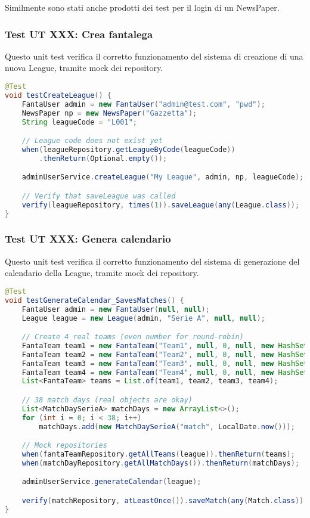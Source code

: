Similmente sono stati anche prodotti dei test per il login di un NewsPaper.


\subsubsection{Test UT XXX: Crea fantalega} \label{UT3}

Questo unit test verifica il corretto funzionamento del sistema di creazione di una nuova League,
tramite mock dei repository.

\begin{lstlisting}[language=Java]
@Test
void testCreateLeague() {
	FantaUser admin = new FantaUser("admin@test.com", "pwd");
	NewsPaper np = new NewsPaper("Gazzetta");
	String leagueCode = "L001";

	// League code does not exist yet
	when(leagueRepository.getLeagueByCode(leagueCode))
        .thenReturn(Optional.empty());

	adminUserService.createLeague("My League", admin, np, leagueCode);

	// Verify that saveLeague was called
	verify(leagueRepository, times(1)).saveLeague(any(League.class));
}
\end{lstlisting}


\subsubsection{Test UT XXX: Genera calendario} \label{UT4}

Questo unit test verifica il corretto funzionamento del sistema di generazione del calendario della League,
tramite mock dei repository.

\begin{lstlisting}[language=Java]
@Test
void testGenerateCalendar_SavesMatches() {
	FantaUser admin = new FantaUser(null, null);
	League league = new League(admin, "Serie A", null, null);

	// Create 4 real teams (even number for round-robin)
	FantaTeam team1 = new FantaTeam("Team1", null, 0, null, new HashSet<>());
	FantaTeam team2 = new FantaTeam("Team2", null, 0, null, new HashSet<>());
	FantaTeam team3 = new FantaTeam("Team3", null, 0, null, new HashSet<>());
	FantaTeam team4 = new FantaTeam("Team4", null, 0, null, new HashSet<>());
	List<FantaTeam> teams = List.of(team1, team2, team3, team4);

	// 38 match days (real objects are okay)
	List<MatchDaySerieA> matchDays = new ArrayList<>();
	for (int i = 0; i < 38; i++)
		matchDays.add(new MatchDaySerieA("match", LocalDate.now()));

	// Mock repositories
	when(fantaTeamRepository.getAllTeams(league)).thenReturn(teams);
	when(matchDayRepository.getAllMatchDays()).thenReturn(matchDays);

	adminUserService.generateCalendar(league);

    verify(matchRepository, atLeastOnce()).saveMatch(any(Match.class));
}
\end{lstlisting}


